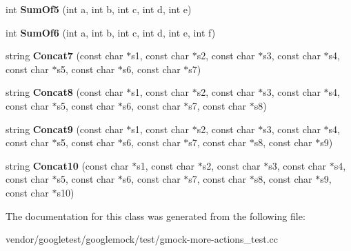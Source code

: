 \begin{DoxyCompactItemize}
\item 
\mbox{\label{classtesting_1_1gmock__more__actions__test_1_1_foo_a55fb0cdc224c450f401e0fea4f979512}} 
int {\bfseries Sum\+Of5} (int a, int b, int c, int d, int e)
\item 
\mbox{\label{classtesting_1_1gmock__more__actions__test_1_1_foo_a34b5ae7cd4620331af92c637e3534bc4}} 
int {\bfseries Sum\+Of6} (int a, int b, int c, int d, int e, int f)
\item 
\mbox{\label{classtesting_1_1gmock__more__actions__test_1_1_foo_a267eab73377069cdd153f351e577ec01}} 
string {\bfseries Concat7} (const char $\ast$s1, const char $\ast$s2, const char $\ast$s3, const char $\ast$s4, const char $\ast$s5, const char $\ast$s6, const char $\ast$s7)
\item 
\mbox{\label{classtesting_1_1gmock__more__actions__test_1_1_foo_a8457ede63aec737d6e7c42b3c11b993a}} 
string {\bfseries Concat8} (const char $\ast$s1, const char $\ast$s2, const char $\ast$s3, const char $\ast$s4, const char $\ast$s5, const char $\ast$s6, const char $\ast$s7, const char $\ast$s8)
\item 
\mbox{\label{classtesting_1_1gmock__more__actions__test_1_1_foo_a96946ff77b6fa4f1d333592bc18e37e4}} 
string {\bfseries Concat9} (const char $\ast$s1, const char $\ast$s2, const char $\ast$s3, const char $\ast$s4, const char $\ast$s5, const char $\ast$s6, const char $\ast$s7, const char $\ast$s8, const char $\ast$s9)
\item 
\mbox{\label{classtesting_1_1gmock__more__actions__test_1_1_foo_ac9c9711d423f0125fb46f468a04862fd}} 
string {\bfseries Concat10} (const char $\ast$s1, const char $\ast$s2, const char $\ast$s3, const char $\ast$s4, const char $\ast$s5, const char $\ast$s6, const char $\ast$s7, const char $\ast$s8, const char $\ast$s9, const char $\ast$s10)
\end{DoxyCompactItemize}


The documentation for this class was generated from the following file\+:\begin{DoxyCompactItemize}
\item 
vendor/googletest/googlemock/test/gmock-\/more-\/actions\+\_\+test.\+cc\end{DoxyCompactItemize}
